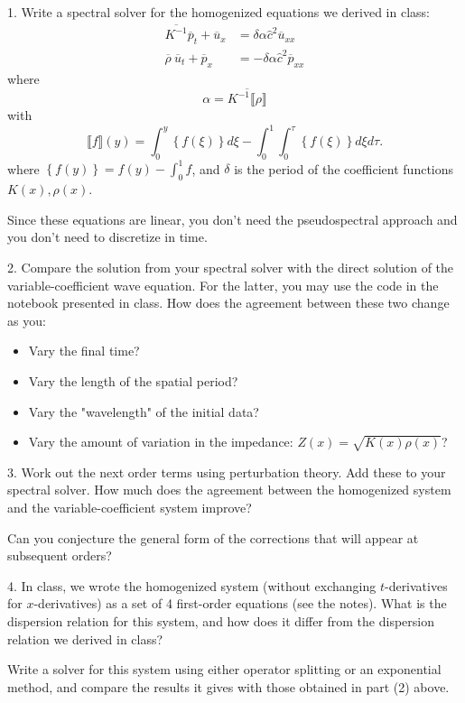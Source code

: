 \documentclass{article}
\newcommand{\fluctint}[1]{\llbracket #1 \rrbracket}
\begin{document}
1.  Write a spectral solver for the homogenized equations we derived in class:
\begin{align}
    \overline{K^{-1}} \overline{p}_t + \overline{u}_x & = \delta \alpha \hat{c}^2 \overline{u}_{xx} \\
    \overline{\rho} \  \overline{u}_t + \overline{p}_x & = -\delta \alpha \hat{c}^2 \overline{p}_{xx}
\end{align}
where
$$
    \alpha = \overline{K^{-1}\fluctint{\rho}}
$$
with
$$
    \fluctint{f}(y) = \int_0^y\left\{f(\xi)\right\}d\xi  - \int_0^1 \int_0^\tau \left\{f(\xi)\right\}d\xi d\tau.
$$
where $\left\{f(y)\right\} = f(y) - \int_0^1 f$,
and $\delta$ is the period of the coefficient functions $K(x), \rho(x)$.

Since these equations are linear, you don't need the pseudospectral approach and you don't need to
discretize in time.
\vspace{0.3in}

2.  Compare the solution from your spectral solver with the direct solution of the variable-coefficient wave
equation.  For the latter, you may use the code in the notebook presented in class.  How does the agreement between
these two change as you:
\begin{itemize}
    \item Vary the final time?
    \item Vary the length of the spatial period?
    \item Vary the "wavelength" of the initial data?
    \item Vary the amount of variation in the impedance: $Z(x) = \sqrt{K(x) \rho(x)}$?
\end{itemize}

\vspace{0.3in}
\vspace{0.3in}

3.  Work out the next order terms using perturbation theory.  Add these to your spectral solver.  How much does the agreement between
the homogenized system and the variable-coefficient system improve?

Can you conjecture the general form of the corrections that will appear at subsequent orders?
\vspace{0.3in}

4.  In class, we wrote the homogenized system (without exchanging $t$-derivatives for $x$-derivatives) 
as a set of 4 first-order equations (see the notes).  What is the dispersion relation for this system, and how does it differ
from the dispersion relation we derived in class?

Write a solver for this system using either operator splitting or an exponential method, and compare the results
it gives with those obtained in part (2) above.
\end{document}
